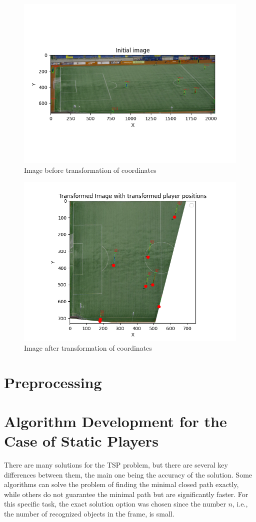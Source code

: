  \begin{figure}[!h]
     \centering
     \includegraphics[width=0.8\linewidth]{figures/Initial image.png}
     \caption{Image before transformation of coordinates}
     \label{fig:before-transform}
 \end{figure}

  \begin{figure}[!h]
     \centering
     \includegraphics[width=0.8\linewidth]{figures/Transformed Image with transformed player positions.png}
     \caption{Image after transformation of coordinates}
     \label{fig:after-transform}
 \end{figure}


\section{Preprocessing}
\section{Algorithm Development for the Case of Static Players}
There are many solutions for the TSP problem, but there are several key differences between them, the main one being the accuracy of the solution. Some algorithms can solve the problem of finding the minimal closed path exactly, while others do not guarantee the minimal path but are significantly faster. For this specific task, the exact solution option was chosen since the number $n$, i.e., the number of recognized objects in the frame, is small.

